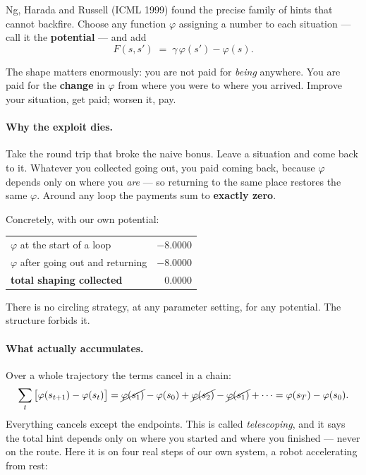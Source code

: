 \documentclass[11pt,a4paper]{article}
\begin{document}
Ng, Harada and Russell (ICML 1999) found the precise family of hints that cannot backfire.
Choose any function $\varphi$ assigning a number to each situation --- call it the
\textbf{potential} --- and add
\begin{equation}
\label{eq:pbrs}
F(s,s') \;=\; \gamma\,\varphi(s') - \varphi(s).
\end{equation}

The shape matters enormously: you are not paid for \emph{being} anywhere. You are paid for
the \textbf{change} in $\varphi$ from where you were to where you arrived. Improve your
situation, get paid; worsen it, pay.

\paragraph{Why the exploit dies.} Take the round trip that broke the naive bonus. Leave a
situation and come back to it. Whatever you collected going out, you paid coming back,
because $\varphi$ depends only on where you \emph{are} --- so returning to the same place
restores the same $\varphi$. Around any loop the payments sum to \textbf{exactly zero}.

Concretely, with our own potential:

\begin{center}
\small
\begin{tabular}{lr}
\toprule
$\varphi$ at the start of a loop        & $-8.0000$ \\
$\varphi$ after going out and returning & $-8.0000$ \\
\midrule
\textbf{total shaping collected}        & $\mathbf{0.0000}$ \\
\bottomrule
\end{tabular}
\end{center}

There is no circling strategy, at any parameter setting, for any potential. The structure
forbids it.

\paragraph{What actually accumulates.} Over a whole trajectory the terms cancel in a chain:
\[
  \sum_t \big[\varphi(s_{t+1}) - \varphi(s_t)\big]
  = \cancel{\varphi(s_1)} - \varphi(s_0) + \cancel{\varphi(s_2)} - \cancel{\varphi(s_1)} + \cdots
  = \varphi(s_T) - \varphi(s_0).
\]
Everything cancels except the endpoints. This is called \emph{telescoping}, and it says the
total hint depends only on where you started and where you finished --- never on the route.
Here it is on four real steps of our own system, a robot accelerating from rest:
\end{document}
